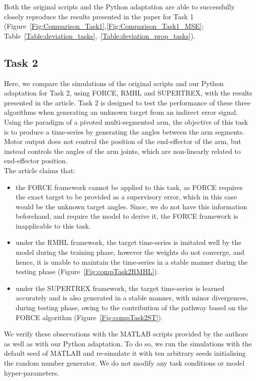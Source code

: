 Both the original scripts and the Python adaptation are able to successfully closely reproduce the results presented in the paper for Task 1 (Figure~\ref{Fig:Comparison_Task1},\ref{Fig:Comparison_Task1_MSE}; Table~\ref{Table:deviation_tasks},~\ref{Table:deviation_prop_tasks}).




\subsection{Task 2}
Here, we compare the simulations of the original scripts and our Python adaptation for Task 2, using FORCE, RMHL and SUPERTREX, with the results presented in the article. Task 2 is designed to test the performance of these three algorithms when generating an unknown target from an indirect error signal. Using the paradigm of a pivoted multi-segmented arm, the objective of this task is to produce a time‐series by generating the angles between the arm segments. Motor output does not control the position of the end-effector of the arm, but instead controls the angles of the arm joints, which are non-linearly related to end-effector position.\\

The article claims that:
\begin{itemize}
\item the FORCE framework cannot be applied to this task, as FORCE requires the exact target to be provided as a supervisory error, which in this case would be the unknown target angles. Since, we do not have this information beforehand, and require the model to derive it, the FORCE framework is inapplicable to this task.  
\item under the RMHL framework, the target time-series is imitated well by the model during the training phase, however the weights do not converge, and hence, it is unable to maintain the time-series in a stable manner during the testing phase (Figure~\ref{Fig:compTask2RMHL}).
\item under the SUPERTREX framework, the target time-series is learned accurately and is also generated in a stable manner, with minor divergences, during testing phase, owing to the contribution of the pathway based on the FORCE algorithm (Figure~\ref{Fig:compTask2ST}).
\end{itemize}

We verify these observations with the MATLAB scripts provided by the authors as well as with our Python adaptation. To do so, we run the simulations with the default seed of MATLAB and re-simulate it with ten arbitrary seeds initialising the random number generator. We do not modify any task conditions or model hyper-parameters.  



